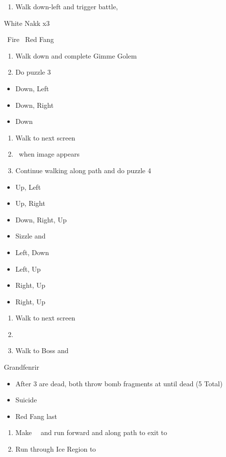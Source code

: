 \begin{enumerate}[resume]
	\item Walk down-left and trigger battle, \cs\
\end{enumerate}
\begin{battle}[]{White Nakk x3}
	\begin{itemize}
		\reynnf\ Fire
		\lannf\ Red Fang
	\end{itemize}
\end{battle}
\begin{enumerate}[resume]
	\item Walk down and complete Gimme Golem
	\item Do puzzle 3
\end{enumerate}
\begin{puzzle}
	\begin{itemize}
		\item Down, Left
		\item Down, Right
		\item Down
	\end{itemize}
\end{puzzle}
\begin{enumerate}[resume]
	\item Walk to next screen
	\item \cs\ when image appears
	\item Continue walking along path and do puzzle 4
\end{enumerate}
\begin{puzzle}
	\begin{itemize}
		\item Up, Left
		\item Up, Right
		\item Down, Right, Up
		\item Sizzle and 
		\item Left, Down
		\item Left, Up
		\item Right, Up
		\item Right, Up
	\end{itemize}
\end{puzzle}
\begin{enumerate}[resume]
	\item Walk to next screen
	\item \save\
	\item Walk to Boss and \cs\
\end{enumerate}
\begin{battle}[]{Grandfenrir}
	\begin{itemize}
		\reynnf\ Fire 
		\lannf\ Red Fang 
		\item After 3  are dead, both throw bomb fragments at  until dead (5 Total)
		\item Suicide \reynn\
		\item Red Fang last 
	\end{itemize}
\end{battle}
\begin{enumerate}[resume]
	\item Make \lann\ \smallc\ and run forward and along path to exit  to 
	\item Run through Ice Region to 
\end{enumerate}